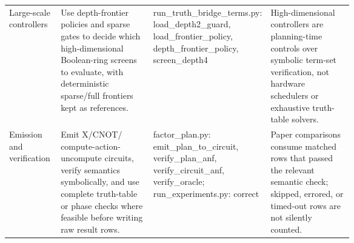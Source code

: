 \begin{tabularx}{\linewidth}{>{\raggedright\arraybackslash}p{0.15\linewidth}>{\raggedright\arraybackslash}X>{\raggedright\arraybackslash}p{0.27\linewidth}>{\raggedright\arraybackslash}p{0.24\linewidth}}
Large-scale controllers & Use depth-frontier policies and sparse gates to decide which high-dimensional Boolean-ring screens to evaluate, with deterministic sparse/full frontiers kept as references. & run\_truth\_bridge\_terms.py: load\_depth2\_guard, load\_frontier\_policy, depth\_frontier\_policy, screen\_depth4 & High-dimensional controllers are planning-time controls over symbolic term-set verification, not hardware schedulers or exhaustive truth-table solvers. \\
Emission and verification & Emit X/CNOT/\mct{} compute-action-uncompute circuits, verify \anf{} semantics symbolically, and use complete truth-table or phase checks where feasible before writing raw result rows. & factor\_plan.py: emit\_plan\_to\_circuit, verify\_plan\_anf, verify\_circuit\_anf, verify\_oracle; run\_experiments.py: correct & Paper comparisons consume matched rows that passed the relevant semantic check; skipped, errored, or timed-out rows are not silently counted. \\
\bottomrule
\end{tabularx}

